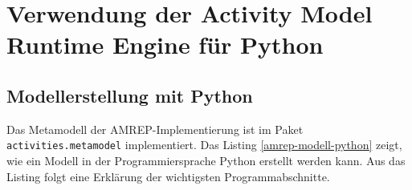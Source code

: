\chapter{Verwendung der Activity Model Runtime Engine für Python}\label{amrep-use}

\section{Modellerstellung mit Python}
Das Metamodell der AMREP-Implementierung ist im Paket \texttt{activities.metamodel} implementiert. Das Listing \ref{amrep-modell-python} zeigt, wie ein Modell in der Programmiersprache Python erstellt werden kann. Aus das Listing folgt eine Erklärung der wichtigsten Programmabschnitte.


